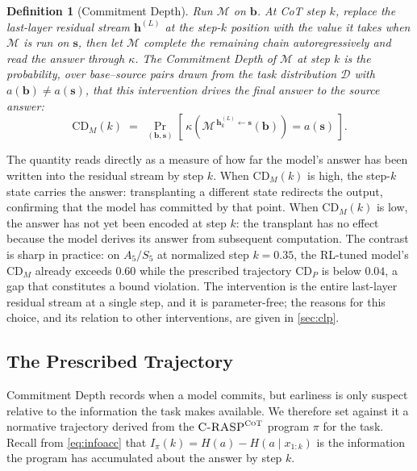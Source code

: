 \documentclass[11pt]{article}
\newtheorem{definition}{Definition}
\newcommand{\CDP}{\mathrm{CD}_{P}}
\newcommand{\CDM}{\mathrm{CD}_{M}}
\newcommand{\stepk}{k}
\newcommand{\CRASPCoT}{\textsc{C-RASP}^{\textsc{CoT}}}
\begin{document}
\begin{definition}[Commitment Depth]
\label{def:cd}
Run $\mathcal{M}$ on $\mathbf{b}$. At CoT step $\stepk$, replace the
last-layer residual stream $\mathbf{h}^{(L)}$ at the step-$\stepk$ position with
the value it takes when $\mathcal{M}$ is run on $\mathbf{s}$, then let
$\mathcal{M}$ complete the remaining chain autoregressively and read the answer
through $\kappa$. The \emph{Commitment Depth} of $\mathcal{M}$ at step $\stepk$
is the probability, over base--source pairs drawn from the task distribution
$\mathcal{D}$ with $a(\mathbf{b})\neq a(\mathbf{s})$, that this intervention
drives the final answer to the source answer:
\begin{equation}
\label{eq:cd}
\CDM(\stepk) \;=\; \Pr_{(\mathbf{b},\mathbf{s})}\!\left[\,
\kappa\!\left(\mathcal{M}^{\,\mathbf{h}^{(L)}_{\stepk}\leftarrow \mathbf{s}}(\mathbf{b})\right)
= a(\mathbf{s})\,\right].
\end{equation}
\end{definition}

The quantity reads directly as a measure of how far the model's answer has
been written into the residual stream by step $\stepk$. When $\CDM(\stepk)$ is
high, the step-$\stepk$ state carries the answer: transplanting a different
state redirects the output, confirming that the model has committed by that
point. When $\CDM(\stepk)$ is low, the answer has not yet been encoded at step
$\stepk$: the transplant has no effect because the model derives its answer from
subsequent computation. The contrast is sharp in practice: on $A_5/S_5$ at
normalized step $\stepk=0.35$, the RL-tuned model's $\CDM$ already exceeds
$0.60$ while the prescribed trajectory $\CDP$ is below $0.04$, a gap that
constitutes a bound violation. The intervention is the entire last-layer
residual stream at a single step, and it is parameter-free; the reasons for this
choice, and its relation to other interventions, are given in \cref{sec:clp}.

\subsection{The Prescribed Trajectory}
\label{sec:cd-prescribed}

Commitment Depth records when a model commits, but earliness is only suspect
relative to the information the task makes available. We therefore set against
it a normative trajectory derived from the $\CRASPCoT$ program $\pi$ for the
task. Recall from \cref{eq:infoacc} that $I_{\pi}(\stepk)=H(a)-H(a\mid
x_{1{:}\stepk})$ is the information the program has accumulated about the answer
by step $\stepk$.
\end{document}
